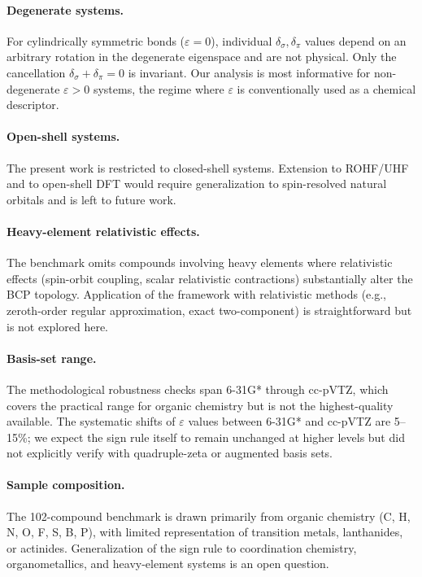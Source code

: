 \documentclass[twoside,natbib]{svjour3}
\newcommand{\delsg}{\delta_{\sigma}}
\newcommand{\delpi}{\delta_{\pi}}
\newcommand{\eps}{\varepsilon}
\begin{document}
\paragraph{Degenerate systems.}
For cylindrically symmetric bonds ($\eps = 0$), individual
$\delsg, \delpi$ values depend on an arbitrary rotation in the
degenerate eigenspace and are not physical. Only the cancellation
$\delsg + \delpi = 0$ is invariant. Our analysis is most
informative for non-degenerate $\eps > 0$ systems, the regime where
$\eps$ is conventionally used as a chemical descriptor.

\paragraph{Open-shell systems.}
The present work is restricted to closed-shell systems. Extension
to ROHF/UHF and to open-shell DFT would require generalization to
spin-resolved natural orbitals and is left to future work.

\paragraph{Heavy-element relativistic effects.}
The benchmark omits compounds involving heavy elements where
relativistic effects (spin-orbit coupling, scalar relativistic
contractions) substantially alter the BCP topology. Application of
the framework with relativistic methods (e.g., zeroth-order regular
approximation, exact two-component) is straightforward but is not
explored here.

\paragraph{Basis-set range.}
The methodological robustness checks span 6-31G* through cc-pVTZ,
which covers the practical range for organic chemistry but is not
the highest-quality available. The systematic shifts of $\eps$
values between 6-31G* and cc-pVTZ are 5--15\%; we expect the
sign rule itself to remain unchanged at higher levels but did not
explicitly verify with quadruple-zeta or augmented basis sets.

\paragraph{Sample composition.}
The 102-compound benchmark is drawn primarily from organic chemistry
(C, H, N, O, F, S, B, P), with limited representation of transition
metals, lanthanides, or actinides. Generalization of the sign rule
to coordination chemistry, organometallics, and heavy-element systems
is an open question.
\end{document}
